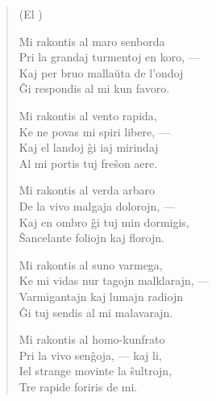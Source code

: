 \begin{verse}
\begin{center}
\footnotesize (El )
\end{center}
                     Mi rakontis al maro senborda\\
                     Pri la grandaj turmentoj en koro, ---\\
                     Kaj per bruo malla\u uta de l'ondoj\\
                     \^Gi respondis al mi kun favoro.

                     Mi rakontis al vento rapida,\\
                     Ke ne povas mi spiri libere, ---\\
                     Kaj el landoj \^gi iaj mirindaj\\
                     Al mi portis tuj fre\^son aere.

                     Mi rakontis al verda arbaro\\
                     De la vivo malgaja dolorojn, ---\\
                     Kaj en ombro \^gi tuj min dormigis,\\
                     \^Sancelante foliojn kaj florojn.

                     Mi rakontis al suno varmega,\\
                     Ke mi vidas nur tagojn malklarajn, ---\\
                     Varmigantajn kaj lumajn radiojn\\
                     \^Gi tuj sendis al mi malavarajn.

                     Mi rakontis al homo-kunfrato\\
                     Pri la vivo sen\^goja, --- kaj li,\\
                     Iel strange movinte la \^sultrojn,\\
                     Tre rapide foriris de mi.
\end{verse}

\smallrule{}